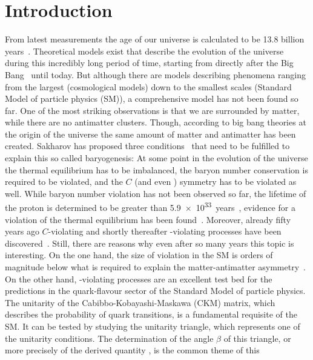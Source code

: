 
\chapter{Introduction}
\label{sec:Introduction}

From latest measurements the age of our universe is calculated to be
\num{13.8} billion years~\cite{Ade:2015xua}. Theoretical models exist that
describe the evolution of the universe during this incredibly long period of
time, starting from directly after the Big Bang~\cite{BigBang} until today.
But although there are models describing phenomena ranging from the largest
(cosmological models) down to the smallest scales (Standard Model of particle
physics (SM)), a comprehensive model has not been found so far. One of the
most striking observations is that we are surrounded by matter, while there
are no antimatter clusters. Though, according to big bang theories at the
origin of the universe the same amount of matter and antimatter has been
created. Sakharov has proposed three conditions~\cite{Sakharov:1967dj} that
need to be fulfilled to explain this so called baryogenesis: At some point in
the evolution of the universe the thermal equilibrium has to be imbalanced,
the baryon number conservation is required to be violated, and the $C$ (and
even \CP) symmetry has to be violated as well. While baryon number violation
has not been observed so far, \eg the lifetime of the proton is determined to
be greater than \SI{5.9e33}{years}~\cite{Abe:2014mwa}, evidence for a
violation of the thermal equilibrium has been found~\cite{ThermalEquilibrium}.
Moreover, already fifty years ago $C$-violating and shortly thereafter
\CP-violating processes have been discovered~\cite{CPV_discovery}. Still,
there are reasons why even after so many years this topic is interesting. On
the one hand, the size of \CP violation in the SM is orders of magnitude below
what is required to explain the matter-antimatter
asymmetry~\cite{Huet:1994jb}. On the other hand, \CP-violating processes are
an excellent test bed for the predictions in the quark-flavour sector of the
Standard Model of particle physics. The unitarity of the
Cabibbo-Kobayashi-Maskawa (CKM) matrix, which describes the probability of
quark transitions, is a fundamental requisite of the SM. It can be tested by
studying the unitarity triangle, which represents one of the unitarity
conditions. The determination of the angle $\beta$ of this triangle, or more
precisely of the derived quantity \sintwobeta, is the common theme of this
